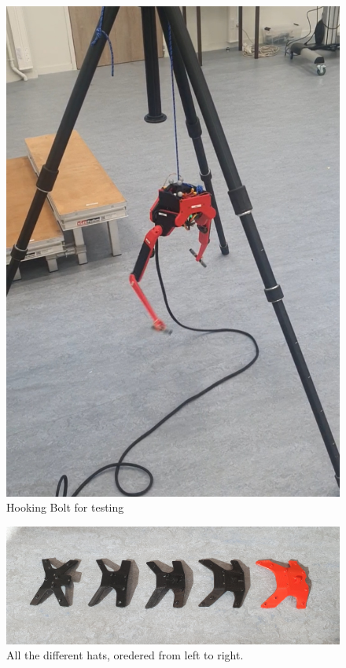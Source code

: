 \documentclass[a4paper,10pt]{article}
\begin{document}
\begin{figure}[H]
\centering
  \includegraphics[width=\linewidth, angle=0, scale=0.3]{./images/Bolt_testing.jpg}
  \caption{Hooking Bolt for testing}
  \label{bolt_hooked}
\end{figure}


\begin{figure}[H]
\centering
  \includegraphics[width=\linewidth, angle=0, scale=0.7]{./images/Bolt_hat_evolution.jpg}
  \caption{All the different hats, oredered from left to right.}
  \label{bolt_hat_evolution}
\end{figure}
\end{document}
